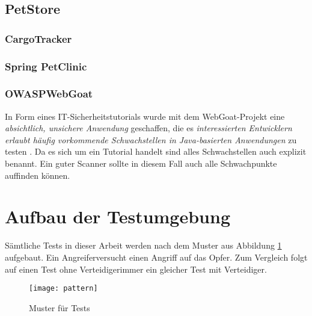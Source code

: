 \subsection{PetStore}

\subsubsection{CargoTracker}

\subsubsection{Spring PetClinic}



\subsubsection{OWASP\textregistered WebGoat}

In Form eines IT-Sicherheitstutorials wurde mit dem WebGoat-Projekt eine \emph{absichtlich, unsichere Anwendung} geschaffen, die es \emph{interessierten Entwicklern erlaubt häufig vorkommende Schwachstellen in Java-basierten Anwendungen} zu testen \cite{owaspgoat}. Da es sich um ein Tutorial handelt sind alles Schwachstellen auch explizit benannt. Ein guter Scanner sollte in diesem Fall auch alle Schwachpunkte auffinden können. 


\section{Aufbau der Testumgebung}

Sämtliche Tests in dieser Arbeit werden nach dem Muster aus Abbildung \ref{fig.pattern} aufgebaut. Ein \glqq Angreifer\grqq versucht einen Angriff auf das \glqq Opfer\grqq. Zum Vergleich folgt auf einen Test ohne \glqq Verteidiger\grqq immer ein gleicher Test mit Verteidiger.

\begin{figure}[bht]
  \begin{center}
    \texttt{[image: pattern]}
    \caption{Muster für Tests}
    \label{fig.pattern}
  \end{center}
\end{figure}

